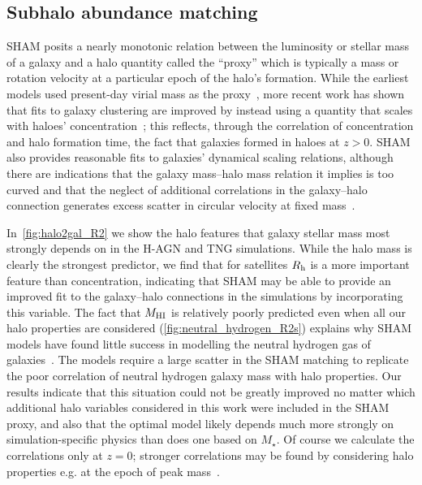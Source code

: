\documentclass[useAMS,usenatbib]{mnras}
\begin{document}
\subsection{Subhalo abundance matching}\label{sec:abundance_match}

SHAM posits a nearly monotonic relation between the luminosity or stellar mass of a galaxy and a halo quantity called the ``proxy'' which is typically a mass or rotation velocity at a particular epoch of the halo's formation. While the earliest models used present-day virial mass as the proxy~\citep{Conroy2006, Moster2010, Behroozi_2010}, more recent work has shown that fits to galaxy clustering are improved by instead using a quantity that scales with haloes' concentration~\citep{Reddick2013, Lehmann2017}; this reflects, through the correlation of concentration and halo formation time, the fact that galaxies formed in haloes at $z>0$. SHAM also provides reasonable fits to galaxies' dynamical scaling relations, although there are indications that the galaxy mass--halo mass relation it implies is too curved and that the neglect of additional correlations in the galaxy--halo connection generates excess scatter in circular velocity at fixed mass~\citep{Trujillo, Desmond_Wechsler_2015, Desmond_Wechsler_2017, Desmond_MDAR, Desmond_BTFR, Li_2022}.

In~\cref{fig:halo2gal_R2} we show the halo features that galaxy stellar mass most strongly depends on in the H-AGN and TNG simulations. While the halo mass is clearly the strongest predictor, we find that for satellites $R_{\rm h}$ is a more important feature than concentration, indicating that SHAM may be able to provide an improved fit to the galaxy--halo connections in the simulations by incorporating this variable. The fact that $M_{\rm HI}$ is relatively poorly predicted even when all our halo properties are considered (\cref{fig:neutral_hydrogen_R2s}) explains why SHAM models have found little success in modelling the neutral hydrogen gas of galaxies~\citep{Guo, Stiskalek2021, Dutta2021}.
The models require a large scatter in the SHAM matching to replicate the poor correlation of neutral hydrogen galaxy mass with halo properties. Our results indicate that this situation could not be greatly improved no matter which additional halo variables considered in this work were included in the SHAM proxy, and also that the optimal model likely depends much more strongly on simulation-specific physics than does one based on $M_\star$. Of course we calculate the correlations only at $z=0$; stronger correlations may be found by considering halo properties e.g. at the epoch of peak mass~\citep{McGibbon}.
\end{document}
